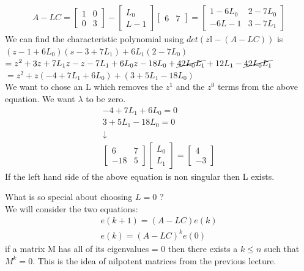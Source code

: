 \documentclass[a4paper,11pt]{article}
\begin{document}
	\begin{gather}
		A-LC = 
		\begin{bmatrix}
			1 & 0\\
			0 & 3 
		\end{bmatrix}-
		\begin{bmatrix}
			L_0\\
			L-1
		\end{bmatrix}
		\begin{bmatrix}
			6 & 7 
		\end{bmatrix}=
		\begin{bmatrix}
			1-6L_0& 2-7L_0\\
			-6L-1 & 3-7L_1
		\end{bmatrix}
	\end{gather}
	We can find the characteristic polynomial using $det(z\mathbb{I}-(A-LC))$ is\\ $(z-1+6L_0)(s-3+7L_1)+6L_1(2-7L_0)$\\
	$=z^2+3z+7L_1z-z-7L_1+6L_0z-18L_0+\cancel{42L_0L_1}+12L_1-\cancel{42L_0L_1}$\\
	$=z^2+z(-4+7L_1+6L_0)+(3+5L_1-18L_0)$ \\
	We want to chose an L which removes the $z^1$ and the $z^0$ terms from the above equation. We want $\lambda$ to be zero.\\
	\begin{gather}
		-4+7L_1+6L_0 = 0\\
		3+5L_1-18L_0 = 0\\
		\downarrow\\
		\begin{bmatrix}
			6 & 7\\
			-18 & 5 
		\end{bmatrix}
		\begin{bmatrix}
			L_0\\
			L_1
		\end{bmatrix}=
		\begin{bmatrix}
			4\\
			-3
		\end{bmatrix}
	\end{gather}
	If the left hand side of the above equation is non singular then L exists.


	What is so special about choosing $L=0$ ? \\
	We will consider the two equations:
	\begin{gather}
		e(k+1) = (A-LC)e(k)\\
		e(k) = (A-LC)^k e(0)
	\end{gather}
	if a matrix M has all of its eigenvalues = 0 then there exists a $k \leq n $ such that $M^k = 0$. This is the idea of nilpotent matrices from the previous lecture.
\end{document}
